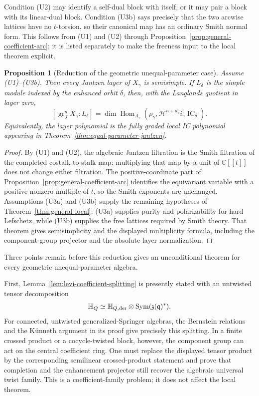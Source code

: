 \documentclass[11pt]{amsart}
\newtheorem{proposition}[theorem]{Proposition}
\theoremstyle{definition}
\theoremstyle{remark}
\newcommand{\Hh}{\mathbb H}
\newcommand{\IC}{\operatorname{IC}}
\begin{document}
Condition (U2) may identify a self-dual block with itself, or it may pair a
block with its linear-dual block.  Condition (U3b) says precisely that the
two arcwise lattices have no $t$-torsion, so their canonical map has an
ordinary Smith normal form.  This follows from (U1) and (U2) through
Proposition~\ref{prop:general-coefficient-arc}; it is listed separately to
make the freeness input to the local theorem explicit.

\begin{proposition}[Reduction of the geometric unequal-parameter case]
\label{prop:unequal-parameter-reduction}
Assume \textup{(U1)}--\textup{(U3b)}.  Then every Jantzen layer of
$X_\gamma$ is semisimple.  If $L_\delta$ is the
simple module indexed by the enhanced orbit $\delta$, then, with the
Langlands quotient in layer zero,
\[
 [\operatorname{gr}_J^nX_\gamma:L_\delta]
 =\dim\operatorname{Hom}_{A_\gamma}\!\left(
   \rho_\gamma,
   \mathcal H^{n+d_\gamma}i_\gamma^!\IC_\delta
  \right).
\]
Equivalently, the layer polynomial is the fully graded local IC polynomial
appearing in Theorem~\ref{thm:equal-parameter-jantzen}.
\end{proposition}

\begin{proof}
By (U1) and (U2), the algebraic Jantzen filtration is the Smith filtration of
the completed costalk-to-stalk map: multiplying that map by a unit of
$\mathbb C[[t]]$ does not change either filtration.  The positive-coordinate
part of Proposition~\ref{prop:general-coefficient-arc} identifies the
equivariant variable with a positive nonzero multiple of $t$, so the Smith
exponents are unchanged.  Assumptions (U3a) and (U3b) supply the remaining
hypotheses of Theorem~\ref{thm:general-local}: (U3a) supplies purity and polarizability
for hard Lefschetz, while (U3b) supplies the free lattices required by Smith
theory.  That theorem gives semisimplicity and the displayed multiplicity
formula, including the component-group projector and the absolute layer
normalization.
\end{proof}

Three points remain before this reduction gives an unconditional theorem for
every geometric unequal-parameter algebra.

First, Lemma~\ref{lem:levi-coefficient-splitting} is presently stated with
an untwisted tensor decomposition
\[
 \Hh_Q\simeq
 \Hh_{Q,{\rm der}}\otimes
 \operatorname{Sym}(\mathfrak z(\mathfrak q)^*).
\]
For connected, untwisted generalized-Springer algebras, the Bernstein
relations and the K\"unneth argument in its proof give precisely this
splitting.  In a finite crossed product or a cocycle-twisted block, however,
the component group can act on the central coefficient ring.  One must
replace the displayed tensor product by the corresponding semilinear
crossed-product statement and prove that completion and the enhancement
projector still recover the algebraic universal twist family.  This is a
coefficient-family problem; it does not affect the local theorem.
\end{document}
